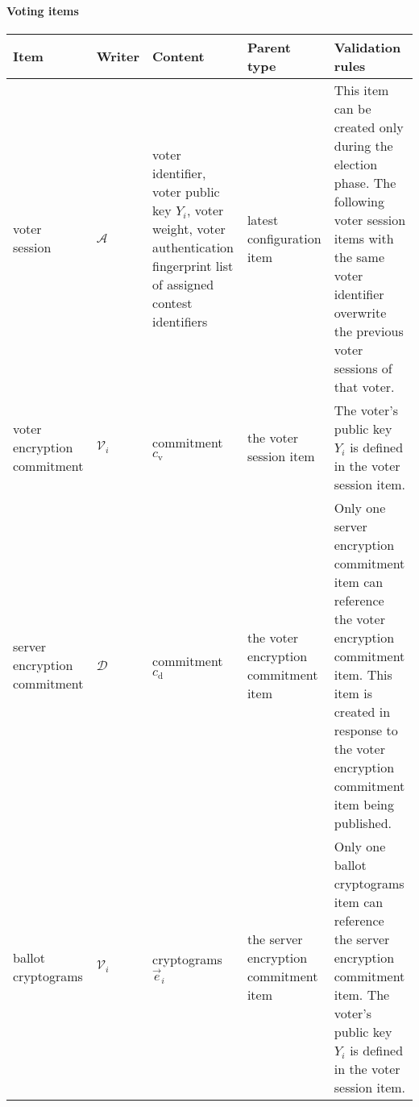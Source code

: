 \begin{landscape}
\clearpage
\paragraph{Voting items}
\begin{longtable}{|
    >{\raggedright}p{} |
    >{\centering}p{} |
    >{\raggedright}p{} |
    >{\raggedright}p{} |
    p{} |
} 
    \hline
    \textbf{Item} &
    \textbf{Writer} &
    \textbf{Content} &
    \textbf{Parent type} &
    \textbf{Validation rules} \\
    \hline
    \endhead

    voter session &
    $\mathcal{A}$ &
    voter identifier, \newline voter public key $Y_i$, \newline voter weight, \newline voter authentication fingerprint \newline list of assigned contest identifiers &
    latest configuration item &
    This item can be created only during the election phase. \newline The following voter session items with the same voter identifier overwrite the previous voter sessions of that voter.
    \\ \hline

    voter encryption commitment &
    $\mathcal{V}_i$ &
    commitment $c_\mathrm{v}$ &
    the voter session item &
    The voter's public key $Y_i$ is defined in the voter session item.
    \\ \hline

    server encryption commitment &
    $\mathcal{D}$ &
    commitment $c_\mathrm{d}$ &
    the voter encryption commitment item &
    Only one server encryption commitment item can reference the voter encryption commitment item. \newline This item is created in response to the voter encryption commitment item being published.
    \\ \hline

    ballot cryptograms &
    $\mathcal{V}_i$ &
    cryptograms $\vec{e}_i$ &
    the server encryption commitment item &
    Only one ballot cryptograms item can reference the server encryption commitment item. \newline The voter's public key $Y_i$ is defined in the voter session item.
    \\ \hline


\end{longtable}
\end{landscape}
